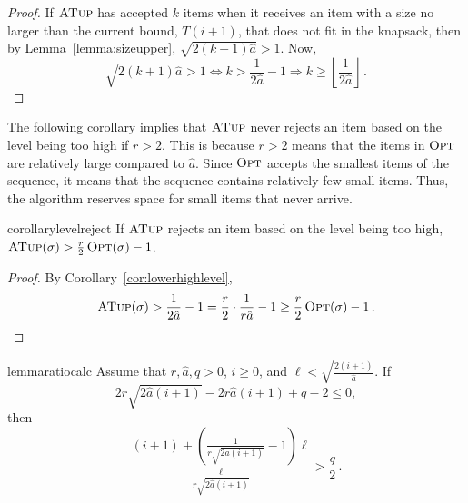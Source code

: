 \documentclass[a4paper,UKenglish,cleveref, autoref, thm-restate]{lipics-v2021}
\newcommand{\OPT}{\ensuremath{\operatorname{\textsc{Opt}}}\xspace}
\newcommand{\MLB}{\ensuremath{\operatorname{\textsc{ATup}}}\xspace}
\newcommand{\TF}{T}
\newcommand{\guess}{\ensuremath{\hat{a}}\xspace}
\begin{document}
\begin{proof}
  If \MLB has accepted $k$ items when it receives an item with a size
  no larger than the current bound, $\TF(i+1)$, that does not fit in the
  knapsack, then by Lemma~\ref{lemma:sizeupper}, $\sqrt{2(k+1)\guess} > 1$.
  Now,
$$\sqrt{2(k+1)\guess} > 1 \Leftrightarrow k > \frac{1}{2\guess}-1 \Rightarrow k
\geq \left\lfloor \frac{1}{2\guess} \right\rfloor\,.$$
\end{proof}

The following corollary implies that \MLB never rejects an item based
on the level being too high if $r>2$.  This is because $r>2$ means
that the items in \OPT are relatively large compared to $\guess$.  Since
\OPT accepts the smallest items of the sequence, it means that the
sequence contains relatively few small items.  Thus, the algorithm
reserves space for small items that never arrive.

\begin{restatable}{corollary}{levelreject}
  \label{levelreject}
  If \MLB rejects an item based on the level being too high,
   $\MLB(\sigma) >   \frac{r}{2}\OPT(\sigma)-1$.
\end{restatable}
\begin{proof}
  By Corollary~\ref{cor:lowerhighlevel},
   $$\MLB(\sigma) > \frac{1}{2\guess}-1 =
  \frac{r}{2}\cdot \frac{1}{r\guess} -1 \geq  \frac{r}{2}\OPT(\sigma)-1\,.$$
\end{proof}

\begin{restatable}{lemma}{ratiocalc}
  \label{lemma:ratiocalc}
  Assume that $r, \guess, q > 0$, $i \geq 0$, and
  $\ell < \sqrt{\frac{2(i+1)}{\guess}}$.    If
$$ 2r\sqrt{2\guess(i+1)}-2r\guess(i+1)+q-2 \leq 0,$$ then %
$$ \frac{(i+1)+\left(
    \frac{1}{r\sqrt{2\guess(i+1)}} -1\right)\ell}{\frac{\ell}{r\sqrt{2\guess(i+1)}}} > \frac{q}{2}\,.$$
\end{restatable}
\end{document}
